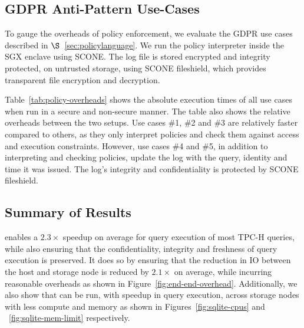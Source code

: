 \subsection{GDPR Anti-Pattern Use-Cases}
\label{subsec:policy-eval}


To gauge the overheads of policy enforcement, we evaluate the GDPR use cases described in $\S$~\ref{sec:policylanguage}. We run the policy interpreter inside the SGX enclave using SCONE. The log file is stored encrypted and integrity protected, on untrusted storage, using SCONE fileshield, which provides transparent file encryption and decryption. 

Table~\ref{tab:policy-overheads} shows the absolute execution times of all use cases when run in a secure and non-secure manner. The table also shows the relative overheads between the two setups. Use cases \#1, \#2 and \#3 are relatively faster compared to others, as they only interpret policies and check them against access and execution constraints. However, use cases \#4 and \#5, in addition to interpreting and checking policies, update the log with the query, identity and time it was issued. The log's integrity and confidentiality is protected by SCONE fileshield. 

\subsection{Summary of Results}

\project{} enables a $2.3\times$ speedup on average for query execution of most TPC-H queries, while also ensuring that the confidentiality, integrity and freshness of query execution is preserved. It does so by ensuring that the reduction in IO between the host and storage node is reduced by $2.1\times$ on average, while incurring reasonable overheads as shown in Figure~\ref{fig:end-end-overhead}. Additionally, we also show that \project{} can be run, with speedup in query execution, across storage nodes with less compute and memory as shown in Figures~\ref{fig:sqlite-cpus} and ~\ref{fig:sqlite-mem-limit} respectively.
